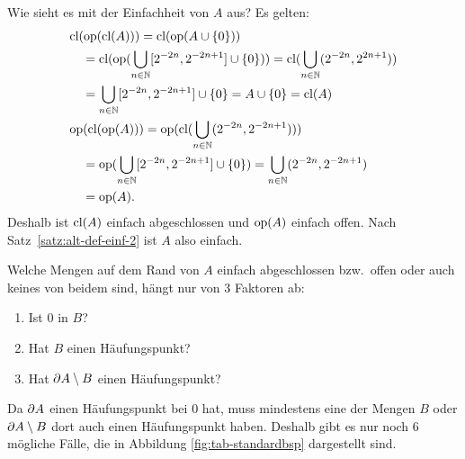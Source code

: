     \noindent
    Wie
    sieht es mit der Einfachheit von $A$ aus?
    Es gelten:
    \begin{align*}
        &\text{cl}(\text{op}(\text{cl}(A))) 
        = \text{cl}(\text{op}(A \cup \{0\})) 
        \\
        &\quad = \text{cl}(\text{op}(\bigcup_{n \in \mathbb{N}} [2^{-2n}, 2^{-2n+1}] \cup \{0\})) 
        = \text{cl}(\bigcup_{n \in \mathbb{N}} (2^{-2n}, 2^{2n+1})) 
        \\
        &\quad = \bigcup_{n \in \mathbb{N}} [2^{-2n}, 2^{-2n+1}] \cup \{0\} 
        = A \cup \{0\} 
        = \text{cl}(A)
        \\
        &\text{op}(\text{cl}(\text{op}(A))) 
        = \text{op}(\text{cl}(\bigcup_{n \in \mathbb{N}} (2^{-2n}, 2^{-2n+1})))
        \\
        &\quad = \text{op}(\bigcup_{n \in \mathbb{N}} [2^{-2n}, 2^{-2n+1}] \cup \{0\})
        = \bigcup_{n \in \mathbb{N}} (2^{-2n}, 2^{-2n+1})
        \\
        &\quad = \text{op}(A).
    \end{align*}
    Deshalb ist $\text{cl}(A)$ einfach abgeschlossen und $\text{op}(A)$ einfach offen. 
    Nach Satz~\ref{satz:alt-def-einf-2} ist $A$ also einfach.\\ 
    \vspace{-5pt}
    
    \noindent
    Welche
    Mengen auf dem Rand von $A$ einfach abgeschlossen bzw.\ offen oder auch keines von beidem sind, hängt nur von 3 Faktoren ab:
    \begin{enumerate}
        \item Ist $0$ in $B$?
        \item Hat $B$ einen Häufungspunkt?
        \item Hat $\partial A \setminus B$ einen Häufungspunkt?
    \end{enumerate}
    \noindent
    Da $\partial A$ einen Häufungspunkt bei $0$ hat, muss mindestens eine der Mengen $B$ oder $\partial A \setminus B$ dort auch einen Häufungspunkt haben.
    Deshalb gibt es nur noch 6 mögliche Fälle, die in Abbildung \ref{fig:tab-standardbsp} dargestellt sind.
    
